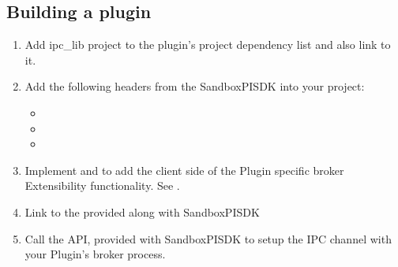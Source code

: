 \documentclass[letterpaper,12pt,english,openany,oneside]{sphinxmanual}
\begin{document}
\subsection{Building a plug\sphinxhyphen{}in}
\label{\detokenize{SandboxBrokerExt:building-a-plug-in}}\begin{enumerate}
%
\item {} 
Add ipc\_lib project to the plug\sphinxhyphen{}in’s project dependency list and also link to it.

\item {} 
Add the following headers from the SandboxPISDK into your project:
\begin{itemize}
\item {} 

\item {} 

\item {} 

\end{itemize}

\item {} 
Implement  and  to add the client side of the Plugin specific broker Extensibility functionality. See .

\item {} 
Link to the  provided along with SandboxPISDK

\item {} 
Call the API,  provided with SandboxPISDK to setup the IPC channel with your Plugin’s broker process.

\end{enumerate}
\end{document}
